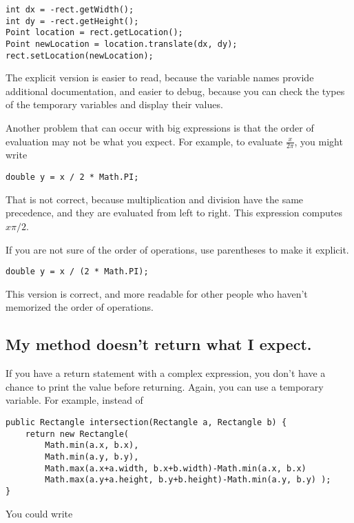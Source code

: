 \documentclass[12pt]{book}
\theoremstyle{definition}
\begin{document}
\begin{lstlisting}
int dx = -rect.getWidth();
int dy = -rect.getHeight();
Point location = rect.getLocation();
Point newLocation = location.translate(dx, dy);
rect.setLocation(newLocation);
\end{lstlisting}
%
The explicit version is easier to read, because the variable
names provide additional documentation, and easier to debug,
because you can check the types of the temporary variables
and display their values.


Another problem that can occur with big expressions is
that the order of evaluation may not be what you expect.
For example, to evaluate
$\frac{x}{2 \pi}$, you might write

\begin{lstlisting}
double y = x / 2 * Math.PI;
\end{lstlisting}
%
That is not correct, because multiplication and division have
the same precedence, and they are evaluated from left to right.
This expression computes $x \pi / 2$.

If you are not sure of the order of operations, use parentheses to
make it explicit.

\begin{lstlisting}
double y = x / (2 * Math.PI);
\end{lstlisting}
%
This version is correct,
and more readable for
other people who haven't memorized the order of operations.



\subsection*{My method doesn't return what I expect.}

If you have a return statement with a complex expression,
you don't have a chance to print the value before
returning.  Again, you can use a temporary variable.  For
example, instead of

\begin{lstlisting}
public Rectangle intersection(Rectangle a, Rectangle b) { 
    return new Rectangle(
        Math.min(a.x, b.x),
        Math.min(a.y, b.y),
        Math.max(a.x+a.width, b.x+b.width)-Math.min(a.x, b.x)
        Math.max(a.y+a.height, b.y+b.height)-Math.min(a.y, b.y) );
}
\end{lstlisting}
%
You could write
\end{document}
